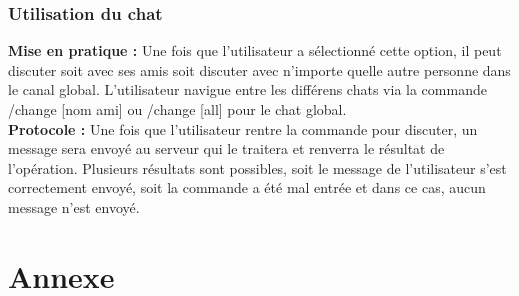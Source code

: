 \documentclass[10pt, a4paper]{article}
\begin{document}
\subsubsection{Utilisation du chat}
\textbf{Mise en pratique :} Une fois que l'utilisateur a sélectionné cette option, il peut discuter soit avec ses amis soit discuter avec n'importe quelle autre personne dans le canal global. L'utilisateur navigue entre les différens chats via la commande /change [nom ami] ou /change [all] pour le chat global.\\
\textbf{Protocole :} Une fois que l'utilisateur rentre la commande pour discuter, un message sera envoyé au serveur qui le traitera et renverra le résultat de l'opération. Plusieurs résultats sont possibles, soit le message de l'utilisateur s'est correctement envoyé, soit la commande a été mal entrée et dans ce cas, aucun message n'est envoyé.\\



\section{Annexe}
\end{document}
